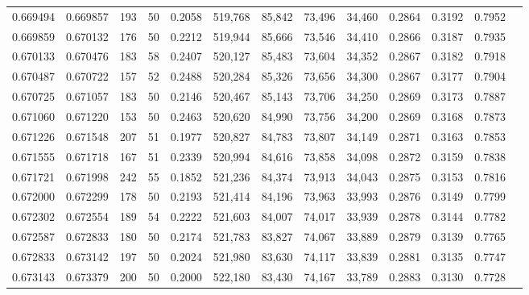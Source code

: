 \begin{tabular}{rrrrrrrrrrrrr}
0.669494 & 0.669857 &   193 &  50 &                                     0.2058 & 519,768 &  85,842 &  73,496 &  34,460 & 0.2864 & 0.3192 & 0.7952 \\
0.669859 & 0.670132 &   176 &  50 &                                     0.2212 & 519,944 &  85,666 &  73,546 &  34,410 & 0.2866 & 0.3187 & 0.7935 \\
0.670133 & 0.670476 &   183 &  58 &                                     0.2407 & 520,127 &  85,483 &  73,604 &  34,352 & 0.2867 & 0.3182 & 0.7918 \\
0.670487 & 0.670722 &   157 &  52 &                                     0.2488 & 520,284 &  85,326 &  73,656 &  34,300 & 0.2867 & 0.3177 & 0.7904 \\
0.670725 & 0.671057 &   183 &  50 &                                     0.2146 & 520,467 &  85,143 &  73,706 &  34,250 & 0.2869 & 0.3173 & 0.7887 \\
0.671060 & 0.671220 &   153 &  50 &                                     0.2463 & 520,620 &  84,990 &  73,756 &  34,200 & 0.2869 & 0.3168 & 0.7873 \\
0.671226 & 0.671548 &   207 &  51 &                                     0.1977 & 520,827 &  84,783 &  73,807 &  34,149 & 0.2871 & 0.3163 & 0.7853 \\
0.671555 & 0.671718 &   167 &  51 &                                     0.2339 & 520,994 &  84,616 &  73,858 &  34,098 & 0.2872 & 0.3159 & 0.7838 \\
0.671721 & 0.671998 &   242 &  55 &                                     0.1852 & 521,236 &  84,374 &  73,913 &  34,043 & 0.2875 & 0.3153 & 0.7816 \\
0.672000 & 0.672299 &   178 &  50 &                                     0.2193 & 521,414 &  84,196 &  73,963 &  33,993 & 0.2876 & 0.3149 & 0.7799 \\
0.672302 & 0.672554 &   189 &  54 &                                     0.2222 & 521,603 &  84,007 &  74,017 &  33,939 & 0.2878 & 0.3144 & 0.7782 \\
0.672587 & 0.672833 &   180 &  50 &                                     0.2174 & 521,783 &  83,827 &  74,067 &  33,889 & 0.2879 & 0.3139 & 0.7765 \\
0.672833 & 0.673142 &   197 &  50 &                                     0.2024 & 521,980 &  83,630 &  74,117 &  33,839 & 0.2881 & 0.3135 & 0.7747 \\
0.673143 & 0.673379 &   200 &  50 &                                     0.2000 & 522,180 &  83,430 &  74,167 &  33,789 & 0.2883 & 0.3130 & 0.7728 \\

\end{tabular}
